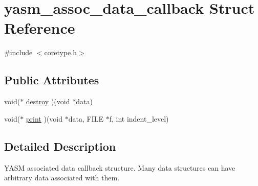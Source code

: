 \hypertarget{structyasm__assoc__data__callback}{\section{yasm\-\_\-assoc\-\_\-data\-\_\-callback Struct Reference}
\label{structyasm__assoc__data__callback}
}


{\ttfamily \#include $<$coretype.\-h$>$}

\subsection*{Public Attributes}
\begin{DoxyCompactItemize}
\item 
void($\ast$ \hyperlink{structyasm__assoc__data__callback_a1fbc19ddb15dd55e44f770406c3935e8}{destroy} )(void $\ast$data)
\item 
void($\ast$ \hyperlink{structyasm__assoc__data__callback_ad9aed1d24cba06f23e8c03b909a13b36}{print} )(void $\ast$data, F\-I\-L\-E $\ast$f, int indent\-\_\-level)
\end{DoxyCompactItemize}


\subsection{Detailed Description}
Y\-A\-S\-M associated data callback structure. Many data structures can have arbitrary data associated with them. 

